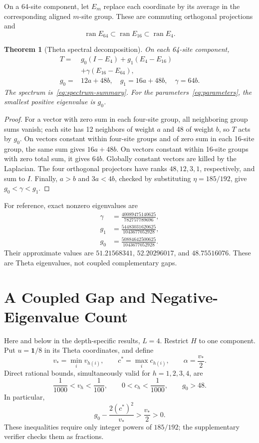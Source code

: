\documentclass[journal,a4paper,10pt]{IEEEtran}
\newtheorem{theorem}{Theorem}
\theoremstyle{definition}\newtheorem{definition}[theorem]{Definition}
\theoremstyle{remark}\newtheorem{remark}[theorem]{Remark}
\newcommand{\one}{\mathbf 1}
\newcommand{\ran}{\operatorname{ran}}
\begin{document}
On a 64-site component, let $E_m$ replace each coordinate by its average in the corresponding aligned $m$-site group. These are commuting orthogonal projections and
\begin{equation}
\ran E_{64}\subset\ran E_{16}\subset\ran E_4.
\end{equation}
\begin{theorem}[Theta spectral decomposition]\label{thm:theta}
On each 64-site component,
\begin{align}\label{eq:Tdecomp}
T={}&g_0(I-E_4)+g_1(E_4-E_{16})\nonumber\\
&+\gamma(E_{16}-E_{64}),\\
g_0={}&12a+48b,\quad g_1=16a+48b,\quad\gamma=64b.\nonumber
\end{align}
The spectrum is~\eqref{eq:spectrum-summary}. For the parameters~\eqref{eq:parameters}, the smallest positive eigenvalue is $g_0$.
\end{theorem}
\begin{proof}
For a vector with zero sum in each four-site group, all neighboring group sums vanish; each site has 12 neighbors of weight $a$ and 48 of weight $b$, so $T$ acts by $g_0$. On vectors constant within four-site groups and of zero sum in each 16-site group, the same sum gives $16a+48b$. On vectors constant within 16-site groups with zero total sum, it gives $64b$. Globally constant vectors are killed by the Laplacian. The four orthogonal projectors have ranks $48,12,3,1$, respectively, and sum to $I$. Finally, $a>b$ and $3a<4b$, checked by substituting $\eta=185/192$, give $g_0<\gamma<g_1$.
\end{proof}
For reference, exact nonzero eigenvalues are
\begin{align}
\gamma&=\frac{40089475140625}{782757789696},\\
g_1&=\frac{54483031620625}{1043677052928},\\
g_0&=\frac{50884642500625}{1043677052928}.
\end{align}
Their approximate values are $51.21568341$, $52.20296017$, and $48.75516076$. These are Theta eigenvalues, not coupled complementary gaps.

\section{A Coupled Gap and Negative-Eigenvalue Count}\label{sec:count}
Here and below in the depth-specific results, $L=4$. Restrict $H$ to one component. Put $u=\one/8$ in its Theta coordinates, and define
\begin{equation}
v_* =\min_i v_{h(i)},\qquad c^*=\max_i c_{h(i)},\qquad
\alpha=\frac{v_*}{2}.
\end{equation}
Direct rational bounds, simultaneously valid for $h=1,2,3,4$, are
\begin{equation}\label{eq:coarse}
\frac1{1000}<v_h<\frac1{100},\qquad
0<c_h<\frac1{1000},\qquad g_0>48.
\end{equation}
In particular,
\begin{equation}\label{eq:margin}
g_0-\frac{2(c^*)^2}{v_*}>\frac{v_*}{2}>0.
\end{equation}
These inequalities require only integer powers of $185/192$; the supplementary verifier checks them as fractions.
\end{document}
